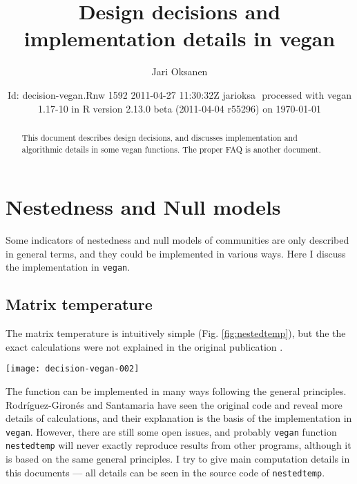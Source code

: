 \documentclass[a4paper,10pt]{amsart}
\author{Jari Oksanen}
\title{Design decisions and implementation details in vegan}
\date{$ $Id: decision-vegan.Rnw 1592 2011-04-27 11:30:32Z jarioksa $ $
  processed with vegan
1.17-10
in R version 2.13.0 beta (2011-04-04 r55296) on \today}
\begin{document}

\maketitle

\begin{abstract}

\noindent This document describes design decisions, and discusses implementation
and algorithmic details in some vegan functions. The proper FAQ is
another document.

\end{abstract}

\tableofcontents

\section{Nestedness and Null models}

Some indicators of nestedness and null models of communities are only
described in general terms, and they could be implemented in various
ways. Here I discuss the implementation in \texttt{vegan}.

\subsection{Matrix temperature}

The matrix temperature is intuitively simple
(Fig. \ref{fig:nestedtemp}), but the the exact calculations were not
explained in the original publication \cite{AtmarPat93}.
\begin{SCfigure}
\texttt{[image: decision-vegan-002]}
\label{fig:nestedtemp}
\caption{Matrix temperature for \emph{Falco subbuteo} on Sibbo
  Svartholmen (dot). The curve is the fill line, and in a cold
  matrix, all presences (red squares) should be in the upper left
  corner behind the fill line. Dashed diagonal line of length $D$ goes
  through the point, and an arrow of length $d$ connects the point to
  the fill line. The ``surprise'' for this point is $u = (d/D)^2$ and
  the matrix temperature is based on the sum of surprises: presences
  outside the fill line or absences within the fill line.}
\end{SCfigure}
The function can be implemented in many ways following the general
principles.  Rodr{\'i}guez-Giron{\'e}s and Santamaria \cite{RodGir06}
have seen the original code and reveal more details of calculations,
and their explanation is the basis of the implementation in
\texttt{vegan}.  However, there are still some open issues, and
probably \texttt{vegan} function \texttt{nestedtemp} will never
exactly reproduce results from other programs, although it is based on
the same general principles. I try to give main computation details in
this documents --- all details can be seen in the source code of
\texttt{nestedtemp}.
\end{document}
